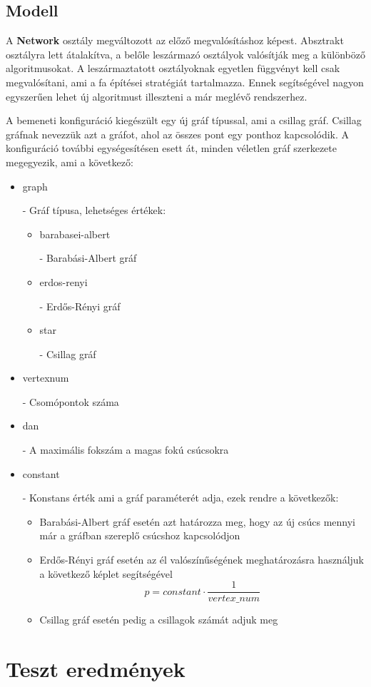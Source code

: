 \documentclass[12pt]{report}
\newcommand{\cmd}[1]{\colorbox{gray!10}{\strut #1}}
\begin{document}
\section{Modell}

A \textbf{Network} osztály megváltozott az előző megvalósításhoz képest.
Absztrakt osztályra lett átalakítva, a belőle leszármazó osztályok valósítják meg a különböző algoritmusokat.
A leszármaztatott osztályoknak egyetlen függvényt kell csak megvalósítani, ami a fa építései stratégiát tartalmazza.
Ennek segítségével nagyon egyszerűen lehet új algoritmust illeszteni a már meglévő rendszerhez.

A bemeneti konfiguráció kiegészült egy új gráf típussal, ami a csillag gráf.
Csillag gráfnak nevezzük azt a gráfot, ahol az összes pont egy ponthoz kapcsolódik.
A konfiguráció további egységesítésen esett át, minden véletlen gráf szerkezete megegyezik, ami a következő:

\begin{itemize}
	\item \cmd{graph} - Gráf típusa, lehetséges értékek:
	\begin{itemize}
		\item \cmd{barabasei-albert} - Barabási-Albert gráf
		\item \cmd{erdos-renyi} - Erdős-Rényi gráf
		\item \cmd{star} - Csillag gráf
	\end{itemize}
	
	\item \cmd{vertex\textunderscore num} - Csomópontok száma
	\item \cmd{dan} - A maximális fokszám a magas fokú csúcsokra
	\item \cmd{constant} - Konstans érték ami a gráf paraméterét adja, ezek rendre a következők:
	
	\begin{itemize}
		\item Barabási-Albert gráf esetén azt határozza meg, hogy az új csúcs mennyi már a gráfban szereplő csúcshoz kapcsolódjon
		\item Erdős-Rényi gráf esetén az él valószínűségének meghatározásra használjuk a következő képlet segítségével  \[p = constant \cdot \frac{1}{vertex\_num}\]
		\item Csillag gráf esetén pedig a csillagok számát adjuk meg
	\end{itemize}
\end{itemize}

\chapter{Teszt eredmények}
\end{document}
